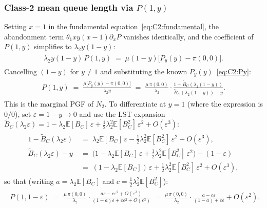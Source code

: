 \subsubsection*{Class-2 mean queue length via $P(1,y)$}

Setting $x=1$ in the fundamental equation~\eqref{eq:C2:fundamental}, the
abandonment term $\theta_1 xy(x-1)\partial_xP$ vanishes identically, and
the coefficient of $P(1,y)$ simplifies to $\lambda_2 y(1-y)$:
\begin{align}
    \begin{split}
        \lambda_2 y(1-y)\,P(1,y)
        \;=\; \mu(1-y)\bigl[P_y(y)-\pi(0,0)\bigr].
    \end{split}
\end{align}
Cancelling $(1-y)$ for $y\neq1$ and substituting the known
$P_y(y)$~\eqref{eq:C2:Py}:
\begin{align}
    \begin{split}
        P(1,y)
        \;=\; \frac{\mu\bigl[P_y(y)-\pi(0,0)\bigr]}{\lambda_2 y}
        \;=\; \frac{\mu\,\pi(0,0)}{\lambda_2}
        \cdot\frac{1-\widetilde{B}_C(\lambda_2(1-y))}{\widetilde{B}_C(\lambda_2(1-y))-y}.
    \end{split}
    \label{eq:C2:P1y}
\end{align}
This is the marginal PGF of $N_2$.  To differentiate at $y=1$ (where the
expression is $0/0$), set $\varepsilon=1-y\to0$ and use the LST expansion
$\widetilde{B}_C(\lambda_2\varepsilon)=1-\lambda_2\mathbb{E}[B_C]\,\varepsilon+\tfrac{1}{2}\lambda_2^2\mathbb{E}[B_C^2]\,\varepsilon^2+O(\varepsilon^3)$:
\begin{align}
    \begin{split}
        1-\widetilde{B}_C(\lambda_2\varepsilon)
        &\;=\; \lambda_2\mathbb{E}[B_C]\,\varepsilon
               -\tfrac{1}{2}\lambda_2^2\mathbb{E}[B_C^2]\,\varepsilon^2+O(\varepsilon^3), \\
        \widetilde{B}_C(\lambda_2\varepsilon)-y
        &\;=\; \bigl(1-\lambda_2\mathbb{E}[B_C]\,\varepsilon+\tfrac{1}{2}\lambda_2^2\mathbb{E}[B_C^2]\,\varepsilon^2\bigr)-(1-\varepsilon) \\
        &\;=\; (1-\lambda_2\mathbb{E}[B_C])\,\varepsilon
               +\tfrac{1}{2}\lambda_2^2\mathbb{E}[B_C^2]\,\varepsilon^2+O(\varepsilon^3),
    \end{split}
\end{align}
so that (writing $a=\lambda_2\mathbb{E}[B_C]$ and $c=\tfrac{1}{2}\lambda_2^2\mathbb{E}[B_C^2]$):
\begin{align}
    \begin{split}
        P(1,1-\varepsilon)
        \;=\; \frac{\mu\,\pi(0,0)}{\lambda_2}
        \cdot\frac{a\varepsilon - c\varepsilon^2+O(\varepsilon^3)}{(1-a)\varepsilon+c\varepsilon^2+O(\varepsilon^3)}
        \;=\; \frac{\mu\,\pi(0,0)}{\lambda_2}
        \cdot\frac{a-c\varepsilon}{(1-a)+c\varepsilon}+O(\varepsilon^2).
    \end{split}
\end{align}
